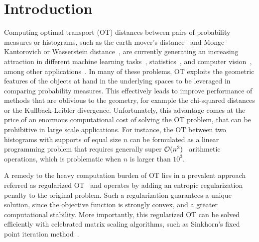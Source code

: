 
\section{Introduction} %
\label{sec:introduction}

Computing optimal transport (OT) distances between pairs of probability measures or histograms, such as the earth mover's distance~\citep{werman1985,Rubner2000} and Monge-Kantorovich or Wasserstein distance~\citep{villani09optimal}, are currently generating an increasing attraction in different machine learning tasks~\citep{pmlr-v32-solomon14,kusnerb2015,pmlr-v70-arjovsky17a,ho2017}, statistics~\citep{frogner2015nips,panaretos2016,ebert2017ConstructionON,bigot2017,flamary2018WDA}, and computer vision~\citep{bonnel2011,Rubner2000,solomon2015}, among other applications~\citep{klouri17,peyre2019COTnowpublisher}.
In many of these problems, OT exploits the geometric features of the objects at hand in the underlying spaces to be leveraged in comparing probability measures.
This effectively leads to improve performance of methods that are oblivious to the geometry, for example the chi-squared distances or the Kullback-Leibler divergence.
Unfortunately, this advantage comes at the price of an enormous computational cost of solving the OT problem, that can be prohibitive in large scale applications.
For instance, the OT between two histograms with supports of equal size $n$ can be formulated as a linear programming problem that requires generally super $\mathcal{O}(n^3)$~\citep{pele2009} arithmetic operations, which is problematic when $n$ is larger than $10^3.$

A remedy to the heavy computation burden of OT lies in a prevalent approach referred as regularized OT~\citep{cuturinips13} and operates by adding an entropic regularization penalty to the original problem.  
Such a regularization guarantees a unique solution, since the objective function is strongly convex, and a greater computational stability.
More importantly, this regularized OT can be solved efficiently with celebrated matrix scaling algorithms, such as Sinkhorn's fixed point iteration method~\citep{sinkhorn1967,knight2008,kalantari2008}. 

